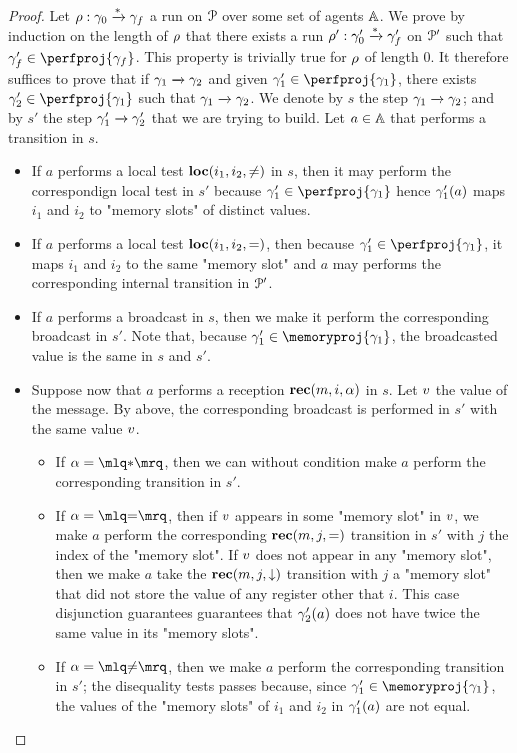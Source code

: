 \begin{proof}
	Let $\rho: \gamma_0 \xrightarrow{*} \gamma_f$ a run on $\mathcal{P}$ over some set of agents $\mathbb{A}$. We prove by induction on the length of $\rho$ that there exists a run $\rho': \gamma_0' \xrightarrow{*} \gamma_f'$ on $\mathcal{P}'$ such that $\config_f' \in \perfproj{\config_f}$. This property is trivially true for $\rho$ of length $0$. It therefore suffices to prove that if $\gamma_1 \xrightarrow{} \gamma_2$ and given $\config_1' \in \perfproj{\config_1}$, there exists $\config_2' \in \perfproj{\config_1}$ such that $\gamma_1 \xrightarrow{} \gamma_2$. We denote by $s$ the step $\gamma_1 \xrightarrow{} \gamma_2$; and by $s'$ the step $\gamma'_1 \xrightarrow{} \gamma'_2$ that we are trying to build. 
	Let $a \in \mathbb{A}$ that performs a transition in $s$.
	\begin{itemize}
	\item If $a$ performs a local test $\textbf{loc}(i_1,i_2,{\ne})$ in $s$, then it may perform the correspondign local test in $s'$ because $\config_1' \in \perfproj{\config_1}$ hence $\gamma_1'(a)$ maps $i_1$ and $i_2$ to "memory slots" of distinct values. 
	\item If $a$ performs a local test  $\textbf{loc}(i_1,i_2,{=})$, then because $\config_1'\in \perfproj{\config_1}$, it maps $i_1$ and $i_2$ to the same "memory slot" and $a$ may performs the corresponding internal transition in $\mathcal{P}'$.  
	\item If $a$ performs a broadcast in $s$, then we make it perform the corresponding broadcast in $s'$. Note that, because $\config_1' \in \memoryproj{\config_1}$, the broadcasted value is the same in $s$ and $s'$. 
	\item 
	Suppose now that $a$ performs a reception $\textbf{rec}(m, i, \alpha)$ in $s$. Let $v$ the value of the message. By above, the corresponding broadcast is performed in $s'$ with the same value $v$. 
		\begin{itemize}
		\item If $\anact = \quotemarks{\dummyact}$, then we can without condition make $a$ perform the corresponding transition in $s'$. 
		\item If $\anact = \quotemarks{\eqtestact}$, then if $v$ appears in some "memory slot" in $v$, we make $a$ perform the corresponding $\textbf{rec}(m, j, {=})$ transition in $s'$ with $j$ the index of the "memory slot". 
		If $v$ does not appear in any "memory slot", then we make $a$ take the $\textbf{rec}(m, j, \downarrow)$ transition with $j$ a "memory slot" that did not store the value of any register other that $i$. This case disjunction guarantees guarantees that $\gamma_2'(a)$ does not have twice the same value in its "memory slots".
		\item If $\anact = \quotemarks{\diseqtestact}$, then we make $a$ perform the corresponding transition in $s'$; the disequality tests passes because, since $\config_1' \in \memoryproj{\config_1}$, the values of the "memory slots" of $i_1$ and $i_2$ in $\gamma_1'(a)$ are not equal.
		\end{itemize}
	\end{itemize}


\end{proof}
